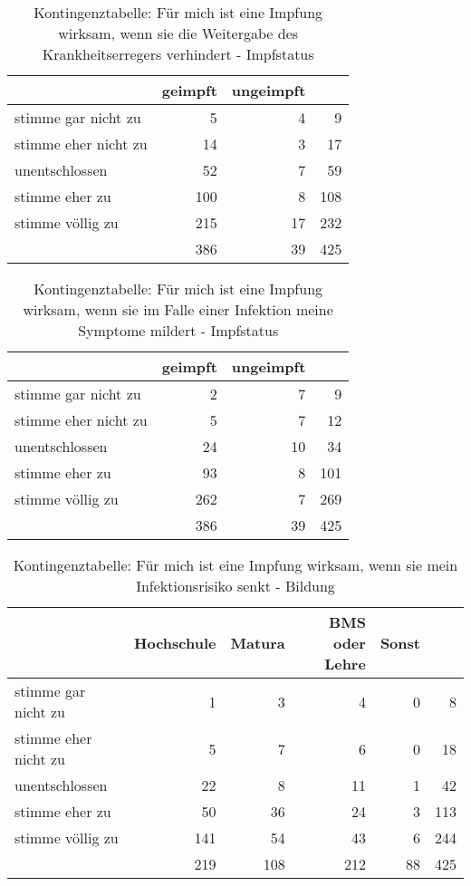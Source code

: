\begin{table}[ht!]
    \centering
    \begin{tabular} {l | r r | r}
        & geimpft & ungeimpft & \\
        \hline
        stimme gar nicht zu & 5 & 4 & 9 \\
        stimme eher nicht zu & 14 & 3 & 17 \\
        unentschlossen & 52 & 7 & 59 \\
        stimme eher zu & 100 & 8 & 108 \\
        stimme völlig zu & 215 & 17 & 232 \\
        \hline
        & 386 & 39 & 425 \\
    \end{tabular}
    \caption{Kontingenztabelle: Für mich ist eine Impfung wirksam, wenn sie die Weitergabe des Krankheitserregers verhindert - Impfstatus}
    \label{tab:chi_weitergabe_impfstatus}
\end{table}

\begin{table}[ht!]
    \centering
    \begin{tabular} {l | r r | r}
        & geimpft & ungeimpft & \\
        \hline
        stimme gar nicht zu & 2 & 7 & 9 \\
        stimme eher nicht zu & 5 & 7 & 12 \\
        unentschlossen & 24 & 10 & 34 \\
        stimme eher zu & 93 & 8 & 101 \\
        stimme völlig zu & 262 & 7 & 269 \\
        \hline
        & 386 & 39 & 425 \\
    \end{tabular}
    \caption{Kontingenztabelle: Für mich ist eine Impfung wirksam, wenn sie im Falle einer Infektion meine Symptome mildert - Impfstatus}
    \label{tab:chi_symptome_impfstatus}
\end{table}


\begin{table}[ht!]
    \centering
    \begin{tabular} {l | r r r r | r}
        & Hochschule & Matura & BMS oder Lehre & Sonst & \\
        \hline
        stimme gar nicht zu & 1 & 3 & 4 & 0 & 8 \\
        stimme eher nicht zu & 5 & 7 & 6 & 0 & 18 \\
        unentschlossen & 22 & 8 & 11 & 1 & 42 \\
        stimme eher zu & 50 & 36 & 24 & 3 & 113 \\
        stimme völlig zu & 141 & 54 & 43 & 6 & 244 \\
        \hline
        & 219 & 108 & 212 & 88 & 425 \\
    \end{tabular}
    \caption{Kontingenztabelle: Für mich ist eine Impfung wirksam, wenn sie mein Infektionsrisiko senkt - Bildung}
    \label{tab:chi_infektionsrisiko_bildung}
\end{table}

